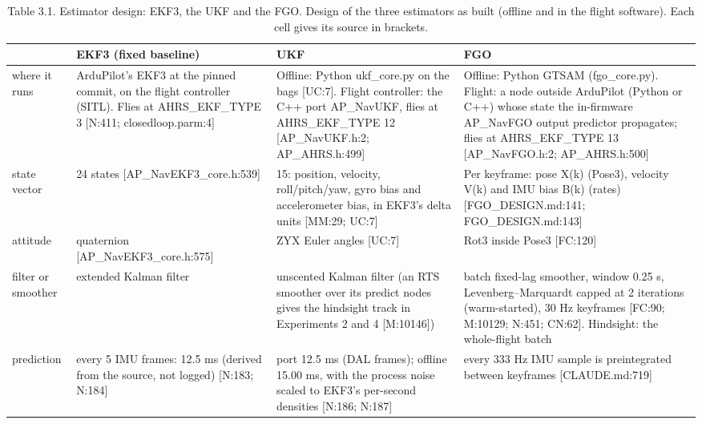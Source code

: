 \begin{table}[htbp]
\centering
\scriptsize
\caption{Table 3.1. Estimator design: EKF3, the UKF and the FGO. Design of the three estimators as built (offline and in the flight software). Each cell gives its source in brackets.}
\label{tab:3-1}
\begin{tabular}{p{}p{}p{}p{}}
\toprule
\textbf{} & \textbf{EKF3 (fixed baseline)} & \textbf{UKF} & \textbf{FGO} \\
\midrule
where it runs & ArduPilot's EKF3 at the pinned commit, on the flight controller (SITL). Flies at AHRS\_EKF\_TYPE 3 [N:411; closedloop.parm:4] & Offline: Python ukf\_core.py on the bags [UC:7]. Flight controller: the C++ port AP\_NavUKF, flies at AHRS\_EKF\_TYPE 12 [AP\_NavUKF.h:2; AP\_AHRS.h:499] & Offline: Python GTSAM (fgo\_core.py). Flight: a node outside ArduPilot (Python or C++) whose state the in-firmware AP\_NavFGO output predictor propagates; flies at AHRS\_EKF\_TYPE 13 [AP\_NavFGO.h:2; AP\_AHRS.h:500] \\
state vector & 24 states [AP\_NavEKF3\_core.h:539] & 15: position, velocity, roll/pitch/yaw, gyro bias and accelerometer bias, in EKF3's delta units [MM:29; UC:7] & Per keyframe: pose X(k) (Pose3), velocity V(k) and IMU bias B(k) (rates) [FGO\_DESIGN.md:141; FGO\_DESIGN.md:143] \\
attitude & quaternion [AP\_NavEKF3\_core.h:575] & ZYX Euler angles [UC:7] & Rot3 inside Pose3 [FC:120] \\
filter or smoother & extended Kalman filter & unscented Kalman filter (an RTS smoother over its predict nodes gives the hindsight track in Experiments 2 and 4 [M:10146]) & batch fixed-lag smoother, window 0.25 s, Levenberg--Marquardt capped at 2 iterations (warm-started), 30 Hz keyframes [FC:90; M:10129; N:451; CN:62]. Hindsight: the whole-flight batch \\
prediction & every 5 IMU frames: 12.5 ms (derived from the source, not logged) [N:183; N:184] & port 12.5 ms (DAL frames); offline 15.00 ms, with the process noise scaled to EKF3's per-second densities [N:186; N:187] & every 333 Hz IMU sample is preintegrated between keyframes [CLAUDE.md:719] \\

\end{tabular}
\end{table}

